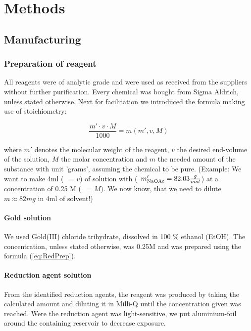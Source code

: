 \section{Methods}
\label{sec:Methods}

\subsection{Manufacturing}

\subsubsection{Preparation of reagent}

All reagents were of analytic grade and were used as received from the suppliers without further  purification. Every chemical was bought from Sigma Aldrich, unless stated otherwise. 
Next for facilitation we introduced the formula making use of stoichiometry:

\begin{equation}
\label{eq:RedPrep}
    \frac{m'\cdot v\cdot M}{1000} = m(m',v,M)
\end{equation}

where $m'$ denotes the molecular weight of the reagent, $v$ the desired end-volume of the solution, $M$ the molar concentration and $m$ the needed amount of the substance with unit 'grams', assuming the chemical to be pure. (Example: We want to make 4ml (~$= v$) of solution with  (~$m'_{\ce{NaOAc}}= 82.03 \frac{g}{mol}$) at a concentration of 0.25 M (~$= M$). We now know, that we need to dilute $m \approx 82mg$  in 4ml of solvent!) 

\paragraph{Gold solution}

We used Gold(III) chloride trihydrate, dissolved in 100 \% ethanol (EtOH). The concentration, unless stated otherwise, was 0.25M and was prepared using the formula (\ref{eq:RedPrep}).


\paragraph{Reduction agent solution}

From the identified reduction agents, the reagent was produced by taking the calculated amount and diluting it in Milli-Q  until the concentration given was reached. Were the reduction agent was light-sensitive, we put aluminium-foil around the containing reservoir to decrease exposure.

